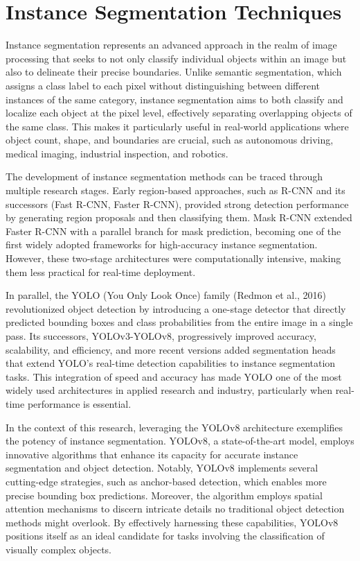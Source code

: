 \section{Instance Segmentation Techniques}

Instance segmentation represents an advanced approach in the realm of image processing that seeks to not only classify individual objects within an image but also to delineate their precise boundaries. Unlike semantic segmentation, which assigns a class label to each pixel without distinguishing between different instances of the same category, instance segmentation aims to both classify and localize each object at the pixel level, effectively separating overlapping objects of the same class. This makes it particularly useful in real-world applications where object count, shape, and boundaries are crucial, such as autonomous driving, medical imaging, industrial inspection, and robotics.


The development of instance segmentation methods can be traced through multiple research stages. Early region-based approaches, such as R-CNN and its successors (Fast R-CNN, Faster R-CNN), provided strong detection performance by generating region proposals and then classifying them. Mask R-CNN extended Faster R-CNN with a parallel branch for mask prediction, becoming one of the first widely adopted frameworks for high-accuracy instance segmentation. However, these two-stage architectures were computationally intensive, making them less practical for real-time deployment.



In parallel, the YOLO (You Only Look Once) family (Redmon et al., 2016) revolutionized object detection by introducing a one-stage detector that directly predicted bounding boxes and class probabilities from the entire image in a single pass. Its successors, YOLOv3-YOLOv8, progressively improved accuracy, scalability, and efficiency, and more recent versions added segmentation heads that extend YOLO's real-time detection capabilities to instance segmentation tasks. This integration of speed and accuracy has made YOLO one of the most widely used architectures in applied research and industry, particularly when real-time performance is essential.



In the context of this research, leveraging the YOLOv8 architecture exemplifies the potency of instance segmentation. YOLOv8, a state-of-the-art model, employs innovative algorithms that enhance its capacity for accurate instance segmentation and object detection. Notably, YOLOv8 implements several cutting-edge strategies, such as anchor-based detection, which enables more precise bounding box predictions. Moreover, the algorithm employs spatial attention mechanisms to discern intricate details no traditional object detection methods might overlook. By effectively harnessing these capabilities, YOLOv8 positions itself as an ideal candidate for tasks involving the classification of visually complex objects.



